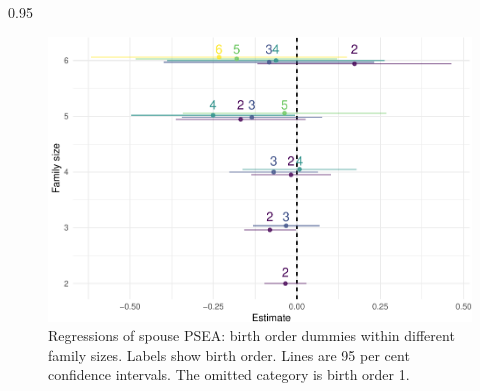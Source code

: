 \documentclass[
]{article}
\theoremstyle{definition}
\theoremstyle{definition}
\theoremstyle{definition}
\theoremstyle{definition}
\theoremstyle{remark}
\begin{document}
\begin{table}[ht]
\begin{centerbox}
\begin{threeparttable}
\begin{tabularx}{0.95\textwidth}
\hhline{}
\end{tabularx}
\end{threeparttable}\par\end{centerbox}

\end{table}
 

\begin{figure}

{\centering \includegraphics{trading-genetics_files/figure-latex/pic-bo-psea-interactions-1} 

}

\caption{Regressions of spouse PSEA: birth order dummies within different family sizes. Labels show birth order. Lines are 95 per cent confidence intervals. The omitted category is birth order 1.}\label{fig:pic-bo-psea-interactions}
\end{figure}

 
  \providecommand{\huxb}[2]{\arrayrulecolor[RGB]{#1}\global\arrayrulewidth=#2pt}
  \providecommand{\huxvb}[2]{\color[RGB]{#1}\vrule width #2pt}
  \providecommand{\huxtpad}[1]{\rule{0pt}{#1}}
  \providecommand{\huxbpad}[1]{\rule[-#1]{0pt}{#1}}
\end{document}
